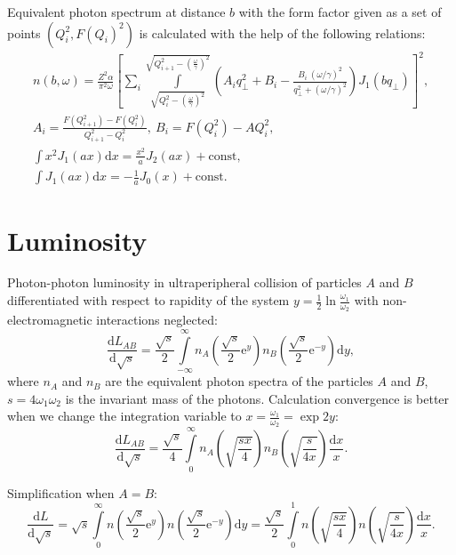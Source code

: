\documentclass[a4paper,12pt]{article}
\begin{document}
Equivalent photon spectrum at distance $b$ with the form factor given as a set
of points $(Q_i^2, F(Q_i)^2)$ is calculated with the help of the following
relations:
\begin{gather}
  n(b, \omega)
  = \frac{Z^2 \alpha}{\pi^2 \omega}
    \left[
      \sum\limits_i
        \int\limits_{\sqrt{Q_i^2 - \left( \frac{\omega}{\gamma} \right)^2}}
                   ^{\sqrt{Q_{i+1}^2 - \left( \frac{\omega}{\gamma} \right)^2}}
          \left(
              A_i q_\perp^2
            + B_i
            - \frac{B_i \ (\omega / \gamma)^2}{q_\perp^2 + (\omega / \gamma)^2}
          \right)
          J_1(b q_\perp)
    \right]^2,
  \\
  A_i = \frac{F(Q_{i+1}^2) - F(Q_i^2)}{Q_{i+1}^2 - Q_i^2},
  \ 
  B_i = F(Q_i^2) - A Q_i^2,
  \\
  \int x^2 J_1(a x) \mathrm{d} x = \frac{x^2}{a} J_2(a x) + \text{const}, \\
  \int J_1(a x) \mathrm{d} x = -\frac{1}{a} J_0(x) + \text{const}.
\end{gather}

\section{Luminosity}

Photon-photon luminosity in ultraperipheral collision of particles $A$ and $B$
differentiated with respect to rapidity of the system $y = \tfrac12 \ln
\tfrac{\omega_1}{\omega_2}$ with non-electromagnetic interactions neglected:
\begin{equation}
  \frac{\mathrm{d} L_{AB}}{\mathrm{d} \sqrt{s}}
  = \frac{\sqrt{s}}{2}
    \int\limits_{-\infty}^{\infty}
      n_A \left( \frac{\sqrt{s}}{2} \mathrm{e}^y \right)
      n_B \left( \frac{\sqrt{s}}{2} \mathrm{e}^{-y} \right)
    \mathrm{d} y,
\end{equation}
where $n_A$ and $n_B$ are the equivalent photon spectra of the particles $A$ and
$B$, $s = 4 \omega_1 \omega_2$ is the invariant mass of the photons. Calculation
convergence is better when we change the integration variable to $x =
\frac{\omega_1}{\omega_2} = \exp{2 y}$:
\begin{equation}
  \frac{\mathrm{d} L_{AB}}{\mathrm{d} \sqrt{s}}
  = \frac{\sqrt{s}}{4}
    \int\limits_0^\infty
       n_A \left( \sqrt{\frac{sx}{4}} \right)
       n_B \left( \sqrt{\frac{s}{4x}} \right)
       \frac{\mathrm{d} x}{x}.
\end{equation}

Simplification when $A = B$:
\begin{equation}
  \frac{\mathrm {d} L}{\mathrm{d} \sqrt{s}}
  = \sqrt{s}
    \int\limits_0^\infty
      n \left( \frac{\sqrt{s}}{2} \mathrm{e}^y \right)
      n \left( \frac{\sqrt{s}}{2} \mathrm{e}^{-y} \right)
    \mathrm{d} y
  = \frac{\sqrt{s}}{2}
    \int\limits_0^1
      n \left( \sqrt{\frac{sx}{4}} \right)
      n \left( \sqrt{\frac{s}{4x}} \right)
      \frac{\mathrm{d} x}{x}.
\end{equation}
\end{document}
